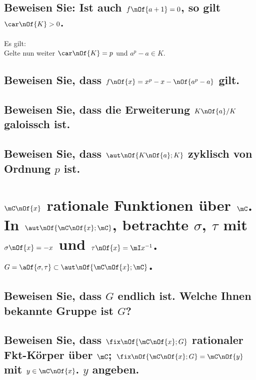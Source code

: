 \documentclass[11pt,a4paper]{scrartcl}
\begin{document}
\subsection{Beweisen Sie: Ist auch $f\nOf{a + 1} = 0$, so gilt $\car\nOf{K} > 0$.}
Es gilt:
\\ Gelte nun weiter $\car\nOf{K} = p$ und $a^p - a \in K$.
\subsection{Beweisen Sie, dass $f\nOf{x} = x^p - x - \nOf{a^p - a}$ gilt.}

\subsection{Beweisen Sie, dass die Erweiterung $K\nOf{a}/K$ galoissch ist.}

\subsection{Beweisen Sie, dass $\aut\nOf{K\nOf{a};K}$ zyklisch von Ordnung $p$ ist.}

\section{$\mC\nOf{x}$ rationale Funktionen über $\mC$. In $\aut\nOf{\mC\nOf{x};\mC}$, betrachte $\sigma$, $\tau$ mit $\sigma\nOf{x} = - x$ und $\tau\nOf{x} = \mI x^{-1}$. $G = \aOf{\sigma,\tau}\subset \aut\nOf{\mC\nOf{x};\mC}$.}

\subsection{Beweisen Sie, dass $G$ endlich ist. Welche Ihnen bekannte Gruppe ist $G$?}

\subsection{Beweisen Sie, dass $\fix\nOf{\mC\nOf{x};G}$ rationaler Fkt-Körper über $\mC$; $\fix\nOf{\mC\nOf{x};G} = \mC\nOf{y}$ mit $y\in\mC\nOf{x}$. $y$ angeben.}	
\end{document}
